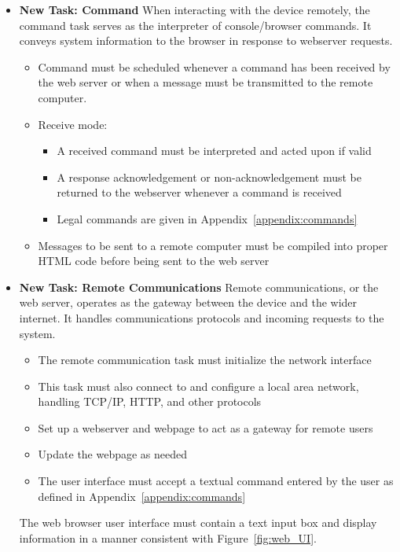 \documentclass[12pt]{article} %
\begin{document}
\begin{itemize}
	\item \textbf{New Task: Command}
		When interacting with the device remotely, the command task serves as the interpreter of console/browser commands. It conveys system information to the browser in response to webserver requests.
		\begin{itemize}
			\item Command must be scheduled whenever a command has been received by
				the web server or when a message must be transmitted to the remote
				computer.
			\item Receive mode:
				\begin{itemize}
					\item A received command must be interpreted and acted upon if valid
					\item A response acknowledgement or non-acknowledgement must be
						returned to the webserver whenever a command is received
					\item Legal commands are given in Appendix~\ref{appendix:commands}
				\end{itemize}
			\item Messages to be sent to a remote computer must be compiled into proper HTML code before being sent to the web server
		\end{itemize}

	\item \textbf{New Task: Remote Communications}
		Remote communications, or the web server, operates as the gateway between
		the device and the wider internet. It handles communications protocols and
		incoming requests to the system.
		\begin{itemize}
			\item The remote communication task must initialize the network interface
			\item This task must also connect to and configure a local area network,
				handling TCP/IP, HTTP, and other protocols
			\item Set up a webserver and webpage to act as a gateway for remote users
			\item Update the webpage as needed
			\item The user interface must accept a textual command entered by the user as defined in Appendix~\ref{appendix:commands}
		\end{itemize}

		The web browser user interface must contain a text input box and display information in a manner consistent with Figure~\ref{fig:web_UI}.


\end{itemize}
\end{document}
